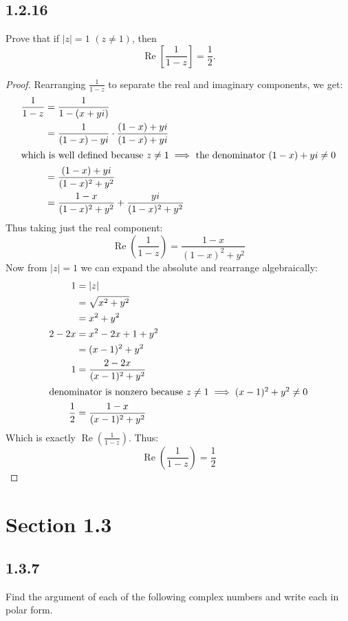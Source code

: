 \documentclass{article}
\begin{document}
\subsection*{1.2.16}
Prove that if $|z| = 1$ $(z \neq 1)$, then
\[
  \operatorname{Re}\left[\frac{1}{1-z}\right] = \frac{1}{2}.
\]
\begin{proof}
  Rearranging $\frac{1}{1-z}$ to separate the real and imaginary components, we get:
  \begin{align*}
    \frac{1}{1-z} &= \frac{1}{1-(x+yi)} \\
      &= \frac{1}{(1-x) - yi} \cdot \frac{(1-x) + yi}{(1-x) + yi} \\
    \intertext{which is well defined because $z \neq 1 \implies$ the denominator $(1-x) + yi \neq 0$}
      &= \frac{(1-x) + yi}{(1-x)^2 + y^2} \\
      &= \frac{1-x}{(1-x)^2 + y^2} + \frac{yi}{(1-x)^2 + y^2}
  \end{align*}
  Thus taking just the real component:
  \[
    \operatorname{Re}\left(\frac{1}{1-z}\right) = \frac{1-x}{(1-x)^2 + y^2}
  \]
  Now from $|z| = 1$ we can expand the absolute and rearrange algebraically:
  \begin{align*}
    1 &= |z| \\
      &= \sqrt{x^2+y^2} \\
      &= x^2 + y^2 \\
    2 - 2x &= x^2 - 2x + 1 + y^2 \\
      &= (x-1)^2 + y^2 \\
    1 &= \frac{2-2x}{(x-1)^2 + y^2} \\
    \intertext{denominator is nonzero because $z \neq 1 \implies (x-1)^2 + y^2 \neq 0$}
    \frac{1}{2} &= \frac{1-x}{(x-1)^2 + y^2}
  \end{align*}
  Which is exactly $\operatorname{Re}\left(\frac{1}{1-z}\right)$. Thus:
  \[
    \operatorname{Re}\left(\frac{1}{1-z}\right) = \frac{1}{2}
  \]
\end{proof}

\section*{Section 1.3}

\subsection*{1.3.7}
Find the argument of each of the following complex numbers and write each in polar form.
\end{document}
